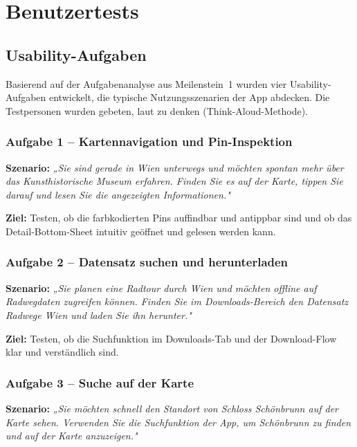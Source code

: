 \section{Benutzertests}

\subsection{Usability-Aufgaben}

Basierend auf der Aufgabenanalyse aus Meilenstein~1
wurden vier Usability-Aufgaben entwickelt, die typische Nutzungsszenarien
der App abdecken.
Die Testpersonen wurden gebeten, laut zu denken (Think-Aloud-Methode).

\subsubsection*{Aufgabe 1 – Kartennavigation und Pin-Inspektion}

\textbf{Szenario:}
\textit{„Sie sind gerade in Wien unterwegs und möchten spontan mehr über
das Kunsthistorische Museum erfahren.
Finden Sie es auf der Karte, tippen Sie darauf und lesen Sie die
angezeigten Informationen."}

\textbf{Ziel:} Testen, ob die farbkodierten Pins auffindbar und antippbar sind
und ob das Detail-Bottom-Sheet intuitiv geöffnet und gelesen werden kann.

\subsubsection*{Aufgabe 2 – Datensatz suchen und herunterladen}

\textbf{Szenario:}
\textit{„Sie planen eine Radtour durch Wien und möchten offline auf
Radwegdaten zugreifen können.
Finden Sie im Downloads-Bereich den Datensatz \emph{Radwege Wien}
und laden Sie ihn herunter."}

\textbf{Ziel:} Testen, ob die Suchfunktion im Downloads-Tab und
der Download-Flow klar und verständlich sind.

\subsubsection*{Aufgabe 3 – Suche auf der Karte}

\textbf{Szenario:}
\textit{„Sie möchten schnell den Standort von \emph{Schloss Schönbrunn}
auf der Karte sehen.
Verwenden Sie die Suchfunktion der App, um Schönbrunn zu finden
und auf der Karte anzuzeigen."}

